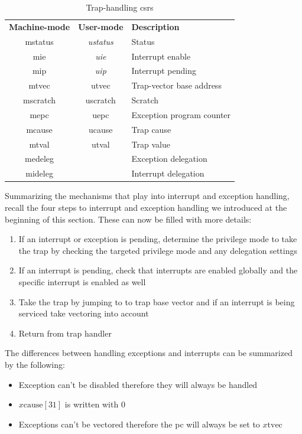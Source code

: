 \begin{table}
    \centering
    \begin{tabular}{| c c || l |}
        \hline
        \textbf{Machine-mode} & \textbf{User-mode} & \textbf{Description} \\
        \acrshort{mstatus} & \textit{\acrshort{ustatus}} & Status \\
        \acrshort{mie} & \textit{\acrshort{uie}} & Interrupt enable \\
        \acrshort{mip} & \textit{\acrshort{uip}} & Interrupt pending \\
        \acrshort{mtvec} & \acrshort{utvec} & Trap-vector base address \\
        \acrshort{mscratch} & \acrshort{uscratch} & Scratch \\
        \acrshort{mepc} & \acrshort{uepc} & Exception program counter \\
        \acrshort{mcause} & \acrshort{ucause} & Trap cause \\
        \acrshort{mtval} & \acrshort{utval} & Trap value \\
        \acrshort{medeleg} & & Exception delegation \\
        \acrshort{mideleg} & & Interrupt delegation \\
        \hline
    \end{tabular}
    \caption{Trap-handling \glspl{csr}}
    \label{tbl:trap-csrs}
\end{table}

Summarizing the mechanisms that play into interrupt and exception handling, recall the four steps to interrupt and exception handling we introduced at the beginning of this section.
These can now be filled with more details:
\begin{enumerate}
    \item If an interrupt or exception is pending, determine the privilege mode to take the trap by checking the targeted privilege mode and any delegation settings
    \item If an interrupt is pending, check that interrupts are enabled globally and the specific interrupt is enabled as well
    \item Take the trap by jumping to to trap base vector and if an interrupt is being serviced take vectoring into account
    \item Return from trap handler
\end{enumerate}

The differences between handling exceptions and interrupts can be summarized by the following:
\begin{itemize}
    \item Exception can't be disabled therefore they will always be handled
    \item $ x\text{cause}[31] $ is written with $ 0 $
    \item Exceptions can't be vectored therefore the \gls{pc} will always be set to $ x\text{tvec} $
\end{itemize}

